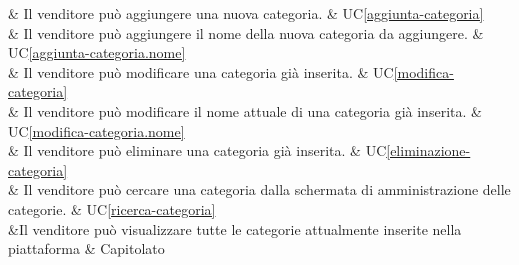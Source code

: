  & Il venditore può aggiungere una nuova categoria. & UC\ref{aggiunta-categoria} \\
    
 & Il venditore può aggiungere il nome della nuova categoria da aggiungere. & UC\ref{aggiunta-categoria.nome} \\
    
 & Il venditore può modificare una categoria già inserita. & UC\ref{modifica-categoria} \\
    
 & Il venditore può modificare il nome attuale di una categoria già inserita. & UC\ref{modifica-categoria.nome} \\
    
 & Il venditore può eliminare una categoria già inserita. & UC\ref{eliminazione-categoria} \\
    
 & Il venditore può cercare una categoria dalla schermata di amministrazione delle categorie. & UC\ref{ricerca-categoria} \\

 &Il venditore può visualizzare tutte le categorie attualmente inserite nella piattaforma & Capitolato \\
